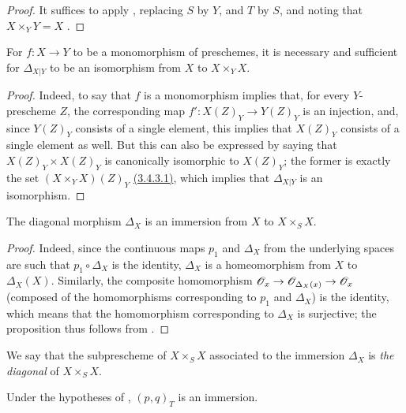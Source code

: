 \begin{proof}
\label{proof-1.5.3.7}
It suffices to apply , replacing $S$ by $Y$, and $T$ by $S$, and noting that $X\times_Y Y=X$ .
\end{proof}

\begin{proposition}[5.3.8]
\label{1.5.3.8}
For $f:X\to Y$ to be a monomorphism of preschemes, it is necessary and sufficient for $\Delta_{X|Y}$ to be an isomorphism from $X$ to $X\times_Y X$.
\end{proposition}

\begin{proof}
\label{1.5.3.8}
Indeed, to say that $f$ is a monomorphism implies that, for every $Y$-prescheme $Z$, the corresponding map $f':X(Z)_Y\to Y(Z)_Y$ is an injection, and, since $Y(Z)_Y$ consists of a single element, this implies that $X(Z)_Y$ consists of a single element as well.
But this can also be expressed by saying that $X(Z)_Y\times X(Z)_Y$ is canonically isomorphic to $X(Z)_Y$; the former is exactly the set $(X\times_Y X)(Z)_Y$ \hyperref[1.3.4.3]{(3.4.3.1)}, which implies that $\Delta_{X|Y}$ is an isomorphism.
\end{proof}

\begin{proposition}[5.3.9]
\label{1.5.3.9}
The diagonal morphism $\Delta_X$ is an immersion from $X$ to $X\times_S X$.
\end{proposition}

\begin{proof}
\label{proof-1.5.3.9}
Indeed, since the continuous maps $p_1$ and $\Delta_X$ from the underlying spaces are such that $p_1\circ\Delta_X$ is the identity, $\Delta_X$ is a homeomorphism from $X$ to $\Delta_X(X)$.
Similarly, the composite homomorphism $\sh{O}_x\to\sh{O}_{\Delta_X(x)}\to\sh{O}_x$ (composed of the homomorphisms corresponding to $p_1$ and $\Delta_X$) is the identity, which means that the homomorphism corresponding to $\Delta_X$ is surjective;
the proposition thus follows from .
\end{proof}

We say that the subprescheme of $X\times_S X$ associated to the immersion $\Delta_X$  is \emph{the diagonal} of $X\times_S X$.

\begin{corollary}[5.3.10]
\label{1.5.3.10}
Under the hypotheses of , $(p,q)_T$ is an immersion.
\end{corollary}

